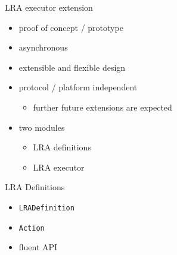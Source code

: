 \documentclass{beamer}
\begin{document}
\begin{frame}{LRA executor extension}

\begin{itemize}
    \item proof of concept / prototype
    \item asynchronous
    \item extensible and flexible design
    \item protocol / platform independent
    \begin{itemize}
        \item further future extensions are expected
    \end{itemize}
    \item two modules
    \begin{itemize}
        \item LRA definitions
        \item LRA executor
    \end{itemize}
\end{itemize}


\end{frame}

\begin{frame}{LRA Definitions}

\begin{itemize}
    \item \texttt{LRADefinition}
    \item \texttt{Action}
    \item fluent API
\end{itemize}

%

%

\hfill \break
\hfill \break
\hfill \break
\hfill \break
\hfill \break
\hfill \break

\end{frame}
\end{document}
